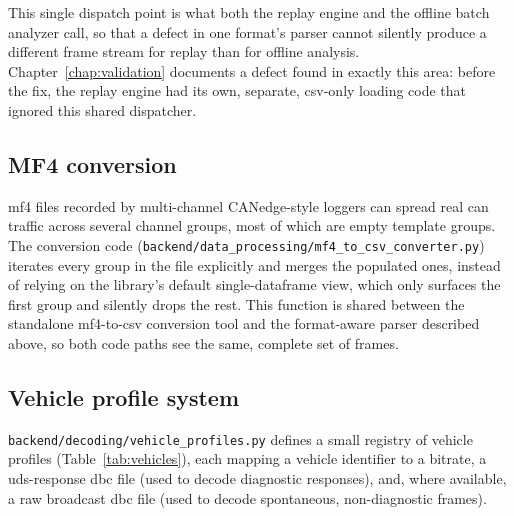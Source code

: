 This single dispatch point is what both the replay engine and the offline batch analyzer call, so that a defect in one format's parser cannot silently produce a different frame stream for replay than for offline analysis. Chapter~\ref{chap:validation} documents a defect found in exactly this area: before the fix, the replay engine had its own, separate, \gls{csv}-only loading code that ignored this shared dispatcher.

\subsection{MF4 conversion}
\label{sec:impl-mf4}

\gls{mf4} files recorded by multi-channel CANedge-style loggers can spread real \gls{can} traffic across several channel groups, most of which are empty template groups. The conversion code (\texttt{backend/data\_processing/mf4\_to\_csv\_converter.py}) iterates every group in the file explicitly and merges the populated ones, instead of relying on the library's default single-dataframe view, which only surfaces the first group and silently drops the rest. This function is shared between the standalone \gls{mf4}-to-\gls{csv} conversion tool and the format-aware parser described above, so both code paths see the same, complete set of frames.

\subsection{Vehicle profile system}
\label{sec:impl-vehicle}

\texttt{backend/decoding/vehicle\_profiles.py} defines a small registry of vehicle profiles (Table~\ref{tab:vehicles}), each mapping a vehicle identifier to a bitrate, a \gls{uds}-response \gls{dbc} file (used to decode diagnostic responses), and, where available, a raw broadcast \gls{dbc} file (used to decode spontaneous, non-diagnostic frames).

